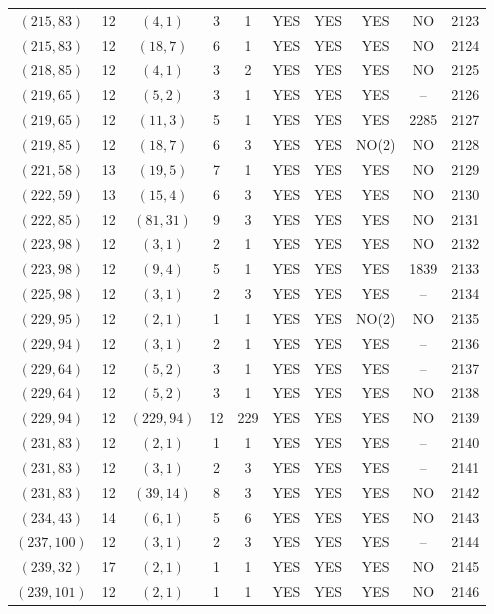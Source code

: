 \begin{longtable}{|c|c|c|c|c|c|c|c|c|c|}
$(215, 83)$ & 12 & $(4, 1)$ & 3 & 1 & YES & YES & YES & NO & 2123\\
$(215, 83)$ & 12 & $(18, 7)$ & 6 & 1 & YES & YES & YES & NO & 2124\\
$(218, 85)$ & 12 & $(4, 1)$ & 3 & 2 & YES & YES & YES & NO & 2125\\
$(219, 65)$ & 12 & $(5, 2)$ & 3 & 1 & YES & YES & YES & -- & 2126\\
$(219, 65)$ & 12 & $(11, 3)$ & 5 & 1 & YES & YES & YES & 2285 & 2127\\
$(219, 85)$ & 12 & $(18, 7)$ & 6 & 3 & YES & YES & NO(2) & NO & 2128\\
$(221, 58)$ & 13 & $(19, 5)$ & 7 & 1 & YES & YES & YES & NO & 2129\\
$(222, 59)$ & 13 & $(15, 4)$ & 6 & 3 & YES & YES & YES & NO & 2130\\
$(222, 85)$ & 12 & $(81, 31)$ & 9 & 3 & YES & YES & YES & NO & 2131\\
$(223, 98)$ & 12 & $(3, 1)$ & 2 & 1 & YES & YES & YES & NO & 2132\\
$(223, 98)$ & 12 & $(9, 4)$ & 5 & 1 & YES & YES & YES & 1839 & 2133\\
$(225, 98)$ & 12 & $(3, 1)$ & 2 & 3 & YES & YES & YES & -- & 2134\\
$(229, 95)$ & 12 & $(2, 1)$ & 1 & 1 & YES & YES & NO(2) & NO & 2135\\
$(229, 94)$ & 12 & $(3, 1)$ & 2 & 1 & YES & YES & YES & -- & 2136\\
$(229, 64)$ & 12 & $(5, 2)$ & 3 & 1 & YES & YES & YES & -- & 2137\\
$(229, 64)$ & 12 & $(5, 2)$ & 3 & 1 & YES & YES & YES & NO & 2138\\
$(229, 94)$ & 12 & $(229, 94)$ & 12 & 229 & YES & YES & YES & NO & 2139\\
$(231, 83)$ & 12 & $(2, 1)$ & 1 & 1 & YES & YES & YES & -- & 2140\\
$(231, 83)$ & 12 & $(3, 1)$ & 2 & 3 & YES & YES & YES & -- & 2141\\
$(231, 83)$ & 12 & $(39, 14)$ & 8 & 3 & YES & YES & YES & NO & 2142\\
$(234, 43)$ & 14 & $(6, 1)$ & 5 & 6 & YES & YES & YES & NO & 2143\\
$(237, 100)$ & 12 & $(3, 1)$ & 2 & 3 & YES & YES & YES & -- & 2144\\
$(239, 32)$ & 17 & $(2, 1)$ & 1 & 1 & YES & YES & YES & NO & 2145\\
$(239, 101)$ & 12 & $(2, 1)$ & 1 & 1 & YES & YES & YES & NO & 2146\\

\end{longtable}
